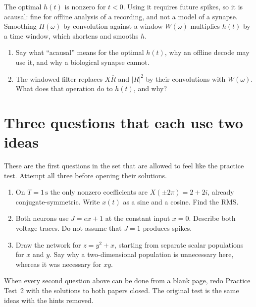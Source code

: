 \documentclass[11pt,letterpaper]{article}
\begin{document}
\begin{idea}
The optimal $h(t)$ is nonzero for $t < 0$. Using it requires future spikes, so it is acausal: fine for offline analysis of a recording, and not a model of a synapse. Smoothing $H(\omega)$ by convolution against a window $W(\omega)$ multiplies $h(t)$ by a time window, which shortens and smooths $h$.
\end{idea}

\begin{enumerate}
\item Say what ``acausal'' means for the optimal $h(t)$, why an offline decode may use it, and why a biological synapse cannot.
\item The windowed filter replaces $X\overline{R}$ and $|R|^2$ by their convolutions with $W(\omega)$. What does that operation do to $h(t)$, and why?
\end{enumerate}

\section{Three questions that each use two ideas}

\begin{trythis}
These are the first questions in the set that are allowed to feel like the practice test. Attempt all three before opening their solutions.
\end{trythis}

\begin{enumerate}
\item On $T = 1\,\mathrm{s}$ the only nonzero coefficients are $X(\pm 2\pi) = 2 + 2i$, already conjugate-symmetric. Write $x(t)$ as a sine and a cosine. Find the RMS.
\item Both neurons use $J = ex + 1$ at the constant input $x = 0$. Describe both voltage traces. Do not assume that $J = 1$ produces spikes.
\item Draw the network for $z = y^2 + x$, starting from separate scalar populations for $x$ and $y$. Say why a two-dimensional population is unnecessary here, whereas it was necessary for $xy$.
\end{enumerate}

\vspace{8pt}
When every second question above can be done from a blank page, redo Practice Test~2 with the solutions to both papers closed. The original test is the same ideas with the hints removed.
\end{document}
